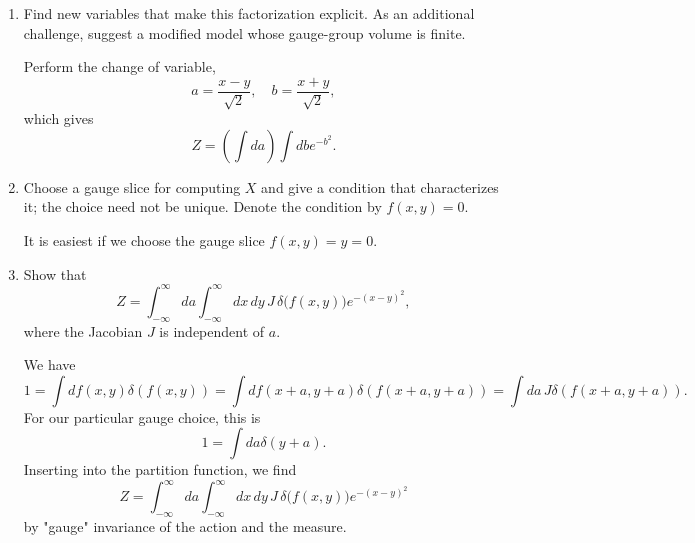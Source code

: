 \begin{enumerate}[label=\alph*),resume]
    \item Find new variables that make this factorization explicit. As an
    additional challenge, suggest a modified model whose gauge-group volume is
    finite.
    \begin{solution}
        Perform the change of variable,
        \begin{equation}
            a = \frac{x-y}{\sqrt{2}}, \quad b = \frac{x+y}{\sqrt{2} },
        \end{equation}
        which gives
        \begin{equation}
            Z = \left(\int da\right)\int db e^{-b^2}.
        \end{equation}
    \end{solution}

    \item Choose a gauge slice for computing $X$ and give a condition that
    characterizes it; the choice need not be unique. Denote the condition by
    $f(x,y)=0$.
    \begin{solution}
        It is easiest if we choose the gauge slice $f(x,y) = y = 0$.
    \end{solution}

    \item Show that
    \begin{equation}
        Z=\int_{-\infty}^{\infty}da
        \int_{-\infty}^{\infty}dx\,dy\,
        J\,\delta\!\bigl(f(x,y)\bigr)e^{-(x-y)^2},
    \end{equation}
    where the Jacobian $J$ is independent of $a$.
    \begin{solution}
        We have
        \begin{equation}
            1 = \int df(x,y) \delta(f(x,y)) = \int df(x+a,y+a) \delta(f(x+a,y+a)) = \int da \, J\delta(f(x+a,y+a)).
        \end{equation}
        For our particular gauge choice, this is
        \begin{equation}
            1 = \int da \delta(y+a).
        \end{equation}
        Inserting into the partition function, we find
        \begin{equation}
            Z=\int_{-\infty}^{\infty}da
        \int_{-\infty}^{\infty}dx\,dy\,
        J\,\delta\!\bigl(f(x,y)\bigr)e^{-(x-y)^2}
        \end{equation}
        by "gauge" invariance of the action and the measure.
    \end{solution}
\end{enumerate}

